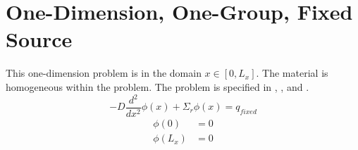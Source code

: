 \section{One-Dimension, One-Group, Fixed Source}
  \label{sec:deriv_1dfixedsrc}
  This one-dimension problem is in the domain $x \in [0,L_x]$. The material is
  homogeneous within the problem.
  The problem is specified in , , and 
  .
  \begin{equation}
    \label{eq:1dfixed}
    -D \frac{d^2}{dx^2} \phi(x) + \Sigma_r \phi(x) = q_{fixed}
  \end{equation}
  \begin{align}
    \label{eq:1dfixed_bc1}
    \phi(0) &= 0 \\
    \label{eq:1dfixed_bc2}
    \phi(L_x) &= 0
  \end{align}
  
